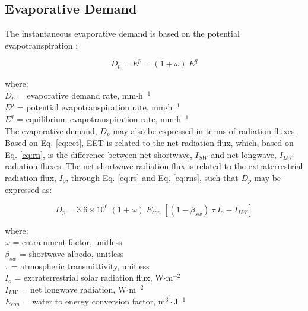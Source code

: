 \subsection{Evaporative Demand}
\label{sec:dp}
The instantaneous evaporative demand is based on the potential evapotranspiration \parencite{federer82}:

\begin{equation}
\label{eq:dp}
	D_p = E^p = \left(1 + \omega \right)\: E^q
\end{equation}

\noindent where: \\
\indent $D_p$ = evaporative demand rate, mm$\cdot$h$^{-1}$\\
\indent $E^p$ = potential evapotranspiration rate, mm$\cdot$h$^{-1}$\\
\indent $E^q$ = equilibrium evapotranspiration rate, mm$\cdot$h$^{-1}$\\

\noindent The evaporative demand, $D_p$ may also be expressed in terms of radiation fluxes. 
Based on Eq. \ref{eq:eet}, EET is related to the net radiation flux, which, based on Eq. \ref{eq:rn}, is the difference between net shortwave, $I_{SW}$ and net longwave, $I_{LW}$ radiation fluxes. 
The net shortwave radiation flux is related to the extraterrestrial radiation flux, $I_o$, through Eq. \ref{eq:rs} and Eq. \ref{eq:rns}, such that $D_p$ may be expressed as:

\begin{equation}
\label{eq:dpa}
	D_p = 3.6\times 10^6\: \left(1 + \omega \right)\: E_{con}\:\left[
		\left(1 - \beta_{sw} \right)\: \tau\: I_o - I_{LW} \right]
\end{equation}

\noindent where:\\
\indent $\omega$ = entrainment factor, unitless \\
\indent $\beta_{sw}$ = shortwave albedo, unitless \\
\indent $\tau$ = atmospheric transmittivity, unitless \\
\indent $I_o$ = extraterrestrial solar radiation flux, W$\cdot$m$^{-2}$ \\
\indent $I_{LW}$ = net longwave radiation, W$\cdot$m$^{-2}$ \\
\indent $E_{con}$ = water to energy conversion factor, m$^{3}\cdot$J$^{-1}$\\

